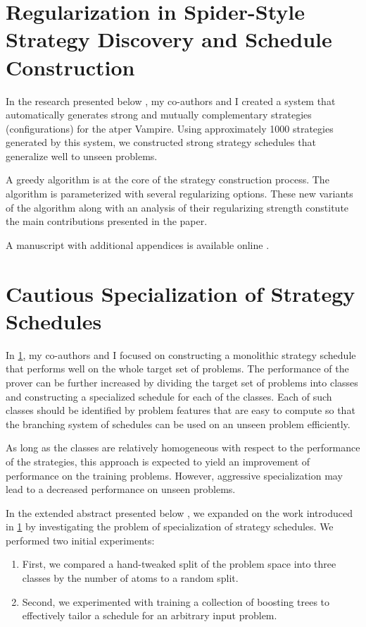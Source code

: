 
\section{Regularization in Spider-Style Strategy Discovery and Schedule Construction}
\label{sec:results:regularization}

In the research presented below \cite{DBLP:conf/ijcar/BartekCS24},
my co-authors and I created a system that automatically generates strong and mutually complementary strategies (configurations) for the \gls{atper} Vampire.
Using approximately 1000 strategies generated by this system,
we constructed strong strategy schedules that generalize well to unseen problems.

A greedy algorithm is at the core of the strategy construction process.
The algorithm is parameterized with several regularizing options.
These new variants of the algorithm along with an analysis of their regularizing strength
constitute the main contributions presented in the paper.

A manuscript with additional appendices is available online \cite{DBLP:journals/corr/abs-2403-12869}.


\section{Cautious Specialization of Strategy Schedules}
\label{sec:results:cautious}

In \cref{sec:results:regularization},
my co-authors and I focused on constructing a monolithic strategy schedule that performs well on the whole target set of problems.
The performance of the prover can be further increased by dividing the target set of problems into classes
and constructing a specialized schedule for each of the classes.
Each of such classes should be identified by problem features that are easy to compute
so that the branching system of schedules can be used on an unseen problem efficiently.

As long as the classes are relatively homogeneous with respect to the performance of the strategies,
this approach is expected to yield an improvement of performance on the training problems.
However, aggressive specialization may lead to a decreased performance on unseen problems.

In the extended abstract presented below \cite{DBLP:conf/paar/BartekC024},
we expanded on the work introduced in \cref{sec:results:regularization}
by investigating the problem of specialization of strategy schedules.
We performed two initial experiments:
\begin{enumerate}
\item First, we compared a hand-tweaked split of the problem space into three classes by the number of atoms to a random split.
\item Second, we experimented with training a collection of boosting trees to effectively tailor a schedule for an arbitrary input problem.
\end{enumerate}

